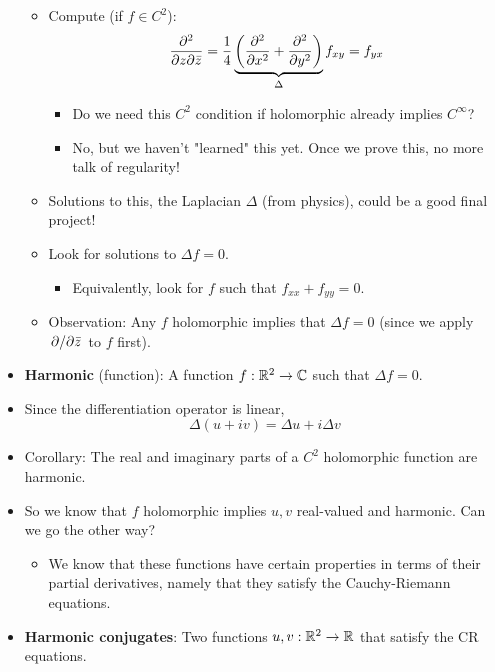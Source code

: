 \documentclass[../notes.tex]{subfiles}
\begin{document}
\begin{itemize}
    \begin{itemize}
        \item Compute (if $f\in C^2$):
        \begin{equation*}
            \pdv{}{z}{\bar{z}} = \frac{1}{4}\underbrace{\left( \pdv[2]{x}+\pdv[2]{y} \right)}_{\Delta}f_{xy}=f_{yx}
        \end{equation*}
        \begin{itemize}
            \item Do we need this $C^2$ condition if holomorphic already implies $C^\infty$?
            \item No, but we haven't "learned" this yet. Once we prove this, no more talk of regularity!
        \end{itemize}
        \item Solutions to this, the Laplacian $\Delta$ (from physics), could be a good final project!
        \item Look for solutions to $\Delta f=0$.
        \begin{itemize}
            \item Equivalently, look for $f$ such that $f_{xx}+f_{yy}=0$.
        \end{itemize}
        \item Observation: Any $f$ holomorphic implies that $\Delta f=0$ (since we apply $\pdv*{\bar{z}}$ to $f$ first).
    \end{itemize}
    \item \textbf{Harmonic} (function): A function $f:\mathbb{R}^2\to\mathbb{C}$ such that $\Delta f=0$.
    \item Since the differentiation operator is linear,
    \begin{equation*}
        \Delta(u+iv) = \Delta u+i\Delta v
    \end{equation*}
    \item Corollary: The real and imaginary parts of a $C^2$ holomorphic function are harmonic.
    \item So we know that $f$ holomorphic implies $u,v$ real-valued and harmonic. Can we go the other way?
    \begin{itemize}
        \item We know that these functions have certain properties in terms of their partial derivatives, namely that they satisfy the Cauchy-Riemann equations.
    \end{itemize}
    \item \textbf{Harmonic conjugates}: Two functions $u,v:\mathbb{R}^2\to\mathbb{R}$ that satisfy the CR equations.

\end{itemize}
\end{document}
